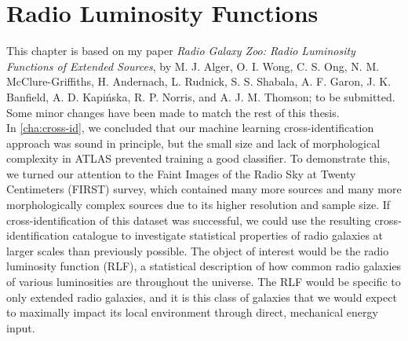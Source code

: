\chapter{Radio Luminosity Functions}
\label{cha:rlfs}





This chapter is based on my paper \emph{Radio Galaxy Zoo: Radio Luminosity Functions of Extended Sources}, by M. J. Alger, O. I. Wong, C. S. Ong, N. M. McClure-Griffiths, H. Andernach, L. Rudnick, S. S. Shabala, A. F. Garon, J. K. Banfield, A. D. Kapi\'nska, R. P. Norris, and A. J. M. Thomson; to be submitted. Some minor changes have been made to match the rest of this thesis.\\

In \autoref{cha:cross-id}, we concluded that our machine learning cross-identification approach was sound in principle, but the small size and lack of morphological complexity in ATLAS prevented training a good classifier. To demonstrate this, we turned our attention to the Faint Images of the Radio Sky at Twenty Centimeters (FIRST) survey, which contained many more sources and many more morphologically complex sources due to its higher resolution and sample size. If cross-identification of this dataset was successful, we could use the resulting cross-identification catalogue to investigate statistical properties of radio galaxies at larger scales than previously possible. The object of interest would be the radio luminosity function (RLF), a statistical description of how common radio galaxies of various luminosities are throughout the universe. The RLF would be specific to only extended radio galaxies, and it is this class of galaxies that we would expect to maximally impact its local environment through direct, mechanical energy input.

